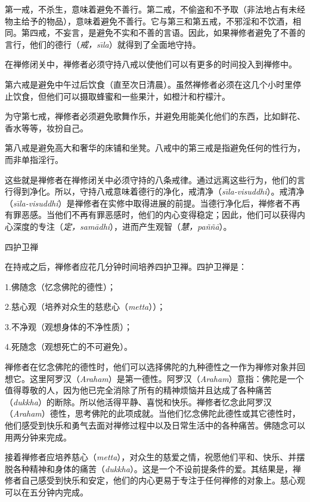 第一戒，不杀生，意味着避免不善行。第二戒，不偷盗和不予取（非法地占有未经物主给予的物品），意味着避免不善行。它与第三和第五戒，不\1邪淫和不饮酒，相同。第四戒，不妄言，是避免不实和不善的言语。因此，如果禅修者避免了不善的言行，他们的德行（{\it 戒，s\=\i la}）就得到了全面地守持。

在禅修闭关中，禅修者必须守持八戒以使他们可以有更多的时间投入到禅修中。

第六戒是避免中午过后饮食（直至次日清晨）。虽然禅修者必须在这几个小时里停止饮食，但他们可以摄取蜂蜜和一些果汁，如橙汁和柠檬汁。

为守第七戒，禅修者必须避免歌舞作乐，并避免用能美化他们的东西，比如鲜花、香水等等，妆扮自己。

第八戒是避免高大和奢华的床铺和坐凳。八戒中的第三戒是指避免任何的性行为，而非单指淫行。

这些就是禅修者在禅修闭关中必须守持的八条戒律。通过远离这些行为，他们的言行得到净化。所以，守持八戒意味着德行的净化，戒清净（{\it s\=\i la-visuddhi}）。戒清净（{\it s\=\i la-visuddhi}）是禅修者在实修中取得进展的前提。当德行净化后，禅修者不再有罪恶感。当他们不再有罪恶感时，他们的内心变得稳定；因此，他们可以获得内心深度的专注（{\it 定，sam\=adhi}），进而产生观智（{\it 慧，pa\~n\~n\=a}）。

\sssubsectnonb \1四护卫禅

在持戒之后，禅修者应花几分钟时间培养四护卫禅。四护卫禅是：

{
\leftskip=1.6pc
\item{1.}佛随念（忆念佛陀的德性）；
\item{2.}慈心观（培养对众生的慈悲心（{\it metta}））；
\item{3.}不净观（观想身体的不净性质）；
\item{4.}死随念（观想死亡的不可避免）。

}

禅修者在忆念佛陀的德性时，他们可以选择佛陀的九种德性之一作为禅修对象并回想它。这里阿罗汉（{\it Araham}）是第一德性。阿罗汉（{\it Araham}）意指：佛陀是一个值得尊敬的人，因为他已完全消除了所有的精神烦恼并且达成了各种痛苦（{\it dukkha}）的断除。所以他活得平静、喜悦和快乐。禅修者忆念此阿罗汉（{\it Araham}）德性，思考佛陀的此项成就。当他们忆念佛陀此德性或其它德性时，他们感受到快乐和勇气去面对禅修过程中以及日常生活中的各种痛苦。佛随念可以用两分钟来完成。

接着禅修者应培养慈心（{\it metta}），对众生的慈爱之情，祝愿他们平和、快乐、并摆脱各种精神和身体的痛苦（{\it dukkha}）。这是一个不设前提条件的爱。其结果是，禅修者自己感受到快乐和安定，他们的内心更易于专注于任何禅修的对象上。慈心观可以在五分钟内完成。

